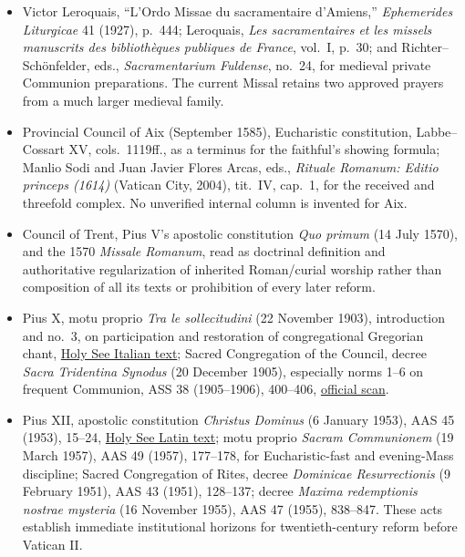 \begin{itemize}[nosep]
  \item Victor Leroquais, ``L'Ordo Missae du sacramentaire d'Amiens,'' \emph{Ephemerides Liturgicae} 41 (1927), p.~444; Leroquais, \emph{Les sacramentaires et les missels manuscrits des bibliothèques publiques de France}, vol.~I, p.~30; and Richter--Schönfelder, eds., \emph{Sacramentarium Fuldense}, no.~24, for medieval private Communion preparations. The current Missal retains two approved prayers from a much larger medieval family.
  \item Provincial Council of Aix (September 1585), Eucharistic constitution, Labbe--Cossart XV, cols.~1119ff., as a terminus for the faithful's showing formula; Manlio Sodi and Juan Javier Flores Arcas, eds., \emph{Rituale Romanum: Editio princeps (1614)} (Vatican City, 2004), tit.~IV, cap.~1, for the received  and threefold  complex. No unverified internal column is invented for Aix.
  \item Council of Trent, Pius V's apostolic constitution \emph{Quo primum} (14 July 1570), and the 1570 \emph{Missale Romanum}, read as doctrinal definition and authoritative regularization of inherited Roman/curial worship rather than composition of all its texts or prohibition of every later reform.
  \item Pius X, motu proprio \emph{Tra le sollecitudini} (22 November 1903), introduction and no.~3, on participation and restoration of congregational Gregorian chant, \href{https://www.vatican.va/content/pius-x/it/motu_proprio/documents/hf_p-x_motu-proprio_19031122_sollecitudini.html}{Holy See Italian text}; Sacred Congregation of the Council, decree \emph{Sacra Tridentina Synodus} (20 December 1905), especially norms 1--6 on frequent Communion, ASS 38 (1905--1906), 400--406, \href{https://www.vatican.va/archive/ass/documents/ASS-38-1905-6-ocr.pdf}{official scan}.
  \item Pius XII, apostolic constitution \emph{Christus Dominus} (6 January 1953), AAS 45 (1953), 15--24, \href{https://www.vatican.va/content/pius-xii/la/apost_constitutions/documents/hf_p-xii_apc_19530106_christus-dominus.html}{Holy See Latin text}; motu proprio \emph{Sacram Communionem} (19 March 1957), AAS 49 (1957), 177--178, for Eucharistic-fast and evening-Mass discipline; Sacred Congregation of Rites, decree \emph{Dominicae Resurrectionis} (9 February 1951), AAS 43 (1951), 128--137; decree \emph{Maxima redemptionis nostrae mysteria} (16 November 1955), AAS 47 (1955), 838--847. These acts establish immediate institutional horizons for twentieth-century reform before Vatican II.

\end{itemize}
